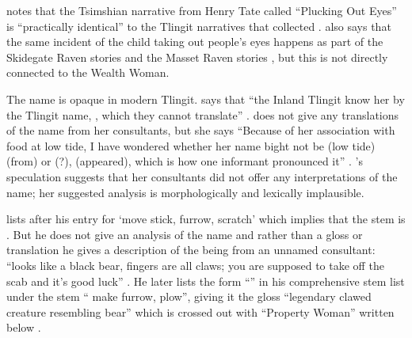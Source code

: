 \citeauthor{boas:1916} notes that the Tsimshian narrative from Henry Tate called “Plucking Out Eyes” \parencite[154–158]{boas:1916} is “practically identical” to the Tlingit narratives that \citeauthor{swanton:1909} collected \parencite[746]{boas:1916}.
\citeauthor{boas:1916} also says that the same incident of the child taking out people’s eyes happens as part of the Skidegate Raven stories \parencite[111]{swanton:1905b} and the Masset Raven stories \parencite[143]{swanton:1905b}, but this is not directly connected to the Wealth Woman.

The name  is opaque in modern Tlingit.
\citeauthor{mcclellan:1975b} says that “the Inland Tlingit know her by the Tlingit name, , which they cannot translate” \parencite[572]{mcclellan:1975b}.
\citeauthor{de-laguna:1972} does not give any translations of the name from her consultants, but she says “Because of her association with food at low tide, I have wondered whether her name bight not be  (low tide)  (from)  or  (?),  (appeared), which is how one informant pronounced it” \parencite[821]{de-laguna:1972}.
\citeauthor{de-laguna:1972}’s speculation suggests that her consultants did not offer any interpretations of the name; her suggested analysis is morphologically and lexically implausible.

\citeauthor{leer:1973} lists  after his entry for  ‘move stick, furrow, scratch’ which implies that the stem is  \parencite[f03/70]{leer:1973}.
But he does not give an analysis of the name and rather than a gloss or translation he gives a description of the being from an unnamed consultant: “looks like a black bear, fingers are all claws; you are supposed to take off the scab and it’s good luck” \parencite[f03/70]{leer:1973}.
He later lists the form “” in his comprehensive stem list under the stem “ make furrow, plow”, giving it the gloss “legendary clawed creature resembling bear” which is crossed out with “Property Woman” written below \parencite[53]{leer:1978b}.


